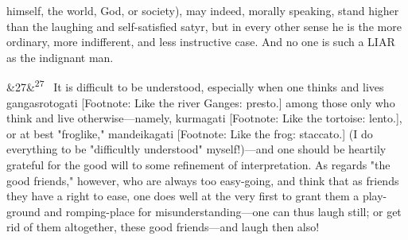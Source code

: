 \documentclass[12pt]{article}
\newcommand{\para}[1][]{\par\noindent\ifx&#1&\else\textsuperscript{\footnotesize #1}~\fi}
\begin{document}
himself, the world, God, or society), may indeed, morally speaking, stand higher than the laughing and self-satisfied satyr, but in every other sense he is the more ordinary, more indifferent, and less instructive case. And no one is such a LIAR as the indignant man.

\para[27] It is difficult to be understood, especially when one thinks and lives gangasrotogati [Footnote: Like the river Ganges: presto.] among those only who think and live otherwise---namely, kurmagati [Footnote: Like the tortoise: lento.], or at best "froglike," mandeikagati [Footnote: Like the frog: staccato.] (I do everything to be "difficultly understood" myself!)---and one should be heartily grateful for the good will to some refinement of interpretation. As regards "the good friends," however, who are always too easy-going, and think that as friends they have a right to ease, one does well at the very first to grant them a play-ground and romping-place for misunderstanding---one can thus laugh still; or get rid of them altogether, these good friends---and laugh then also!
\end{document}
